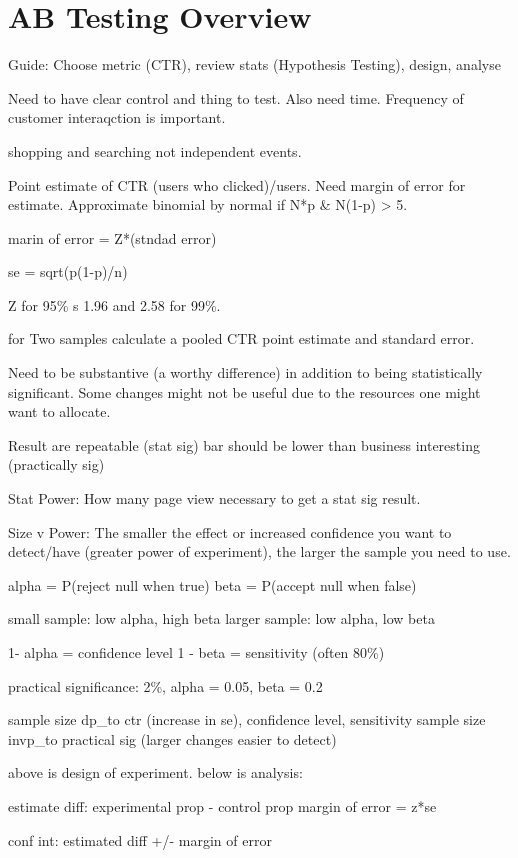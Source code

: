 \documentclass[]{book}
\begin{document}
\section{AB Testing Overview}\label{ab-testing-overview}

Guide: Choose metric (CTR), review stats (Hypothesis Testing), design,
analyse

Need to have clear control and thing to test. Also need time. Frequency
of customer interaqction is important.

shopping and searching not independent events.

Point estimate of CTR (users who clicked)/users. Need margin of error
for estimate. Approximate binomial by normal if N*p \& N(1-p)
\textgreater{} 5.

marin of error = Z*(stndad error)

se = sqrt(p(1-p)/n)

Z for 95\% s 1.96 and 2.58 for 99\%.

for Two samples calculate a pooled CTR point estimate and standard
error.

Need to be substantive (a worthy difference) in addition to being
statistically significant. Some changes might not be useful due to the
resources one might want to allocate.

Result are repeatable (stat sig) bar should be lower than business
interesting (practically sig)

Stat Power: How many page view necessary to get a stat sig result.

Size v Power: The smaller the effect or increased confidence you want to
detect/have (greater power of experiment), the larger the sample you
need to use.

alpha = P(reject null when true) beta = P(accept null when false)

small sample: low alpha, high beta larger sample: low alpha, low beta

1- alpha = confidence level 1 - beta = sensitivity (often 80\%)

practical significance: 2\%, alpha = 0.05, beta = 0.2

sample size dp\_to ctr (increase in se), confidence level, sensitivity
sample size invp\_to practical sig (larger changes easier to detect)

above is design of experiment. below is analysis:

estimate diff: experimental prop - control prop margin of error = z*se

conf int: estimated diff +/- margin of error
\end{document}
